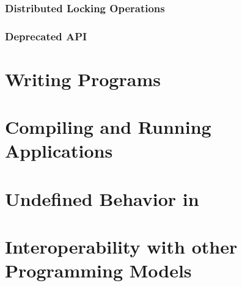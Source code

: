 \documentclass[10pt]{book}
\begin{document}
{%
\subsection{Distributed Locking Operations}
\subsection{Deprecated API}

\clearpage

\appendix
\pagestyle{plain} \withlinenumbers
\chapter{Writing \openshmem Programs}
\pagestyle{plain}%

\chapter{Compiling and Running Applications}

\chapter{Undefined Behavior in \openshmem}
\label{sec:undefined}

\chapter{Interoperability with other Programming Models}
\label{sec:mpi}

\clearpage
}
\end{document}
